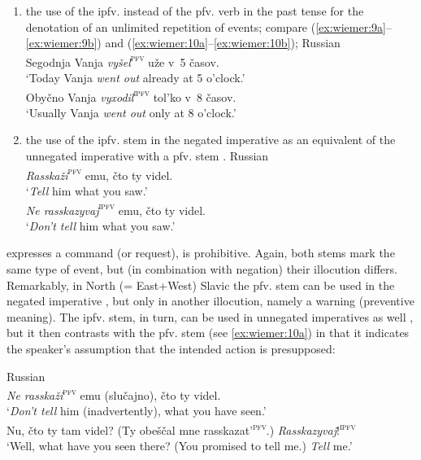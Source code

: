 \documentclass[output=paper]{langscibook}
\begin{document}
\begin{enumerate}
    \item  the use of the ipfv. instead of the pfv. verb in the past tense for the denotation of an unlimited repetition of events; compare (\ref{ex:wiemer:9a}--\ref{ex:wiemer:9b}) and (\ref{ex:wiemer:10a}--\ref{ex:wiemer:10b});
    \ea  Russian\\ 
    \ea Segodnja Vanja \textit{vyšel}\textsc{\textsuperscript{pfv}} uže v~5 časov.\\
        ‘Today Vanja \textit{went out} already at 5 o’clock.’ \label{ex:wiemer:9a} \\
    \ex \label{ex:wiemer:9b} Obyčno Vanja \textit{vyxodil}\textsc{\textsuperscript{ipfv}} tol’ko v~8 časov.\\
        ‘Usually Vanja \textit{went out} only at 8 o’clock.’\\
    \z
    \z
    \item the use of the ipfv. stem in the negated imperative  as an equivalent of the unnegated imperative with a pfv. stem .
    \ea Russian\\ 
    \ea \label{ex:wiemer:10a}\textit{Rasskaži}\textsc{\textsuperscript{pfv}} emu, čto ty videl.\\
        ‘\textit{Tell} him what you saw.’\\
        
    \ex \label{ex:wiemer:10b}\textit{Ne rasskazyvaj}\textsc{\textsuperscript{ipfv}} emu, čto ty videl.\\
        ‘\textit{Don’t tell} him what you saw.’
    \z\z
\end{enumerate}

 expresses a command (or request),  is prohibitive. Again, both stems mark the same type of event, but (in combination with negation) their illocution differs. Remarkably, in North (= East+West) Slavic the pfv. stem can be used in the negated imperative , but only in another illocution, namely a warning (preventive meaning). The ipfv. stem, in turn, can be used in unnegated imperatives as well , but it then contrasts with the pfv. stem (see \ref{ex:wiemer:10a}) in that it indicates the speaker’s assumption that the intended action is presupposed:

\ea 
{Russian} \\ \ea 
    \textit{Ne rasskaži}\textsc{\textsuperscript{pfv}} emu (slučajno), čto ty videl.\\
    ‘\textit{Don’t tell} him (inadvertently), what you have seen.’ \label{ex:wiemer:11a} \\
    \ex \label{ex:wiemer:11b} Nu, čto ty tam videl? (Ty obeščal mne rasskazat’\textsc{\textsuperscript{pfv}}.) \textit{Rasskazyvaj}!\textsc{\textsuperscript{ipfv}}\\
    ‘Well, what have you seen there? (You promised to tell me.) \textit{Tell} me.’
\z \z 
\end{document}
